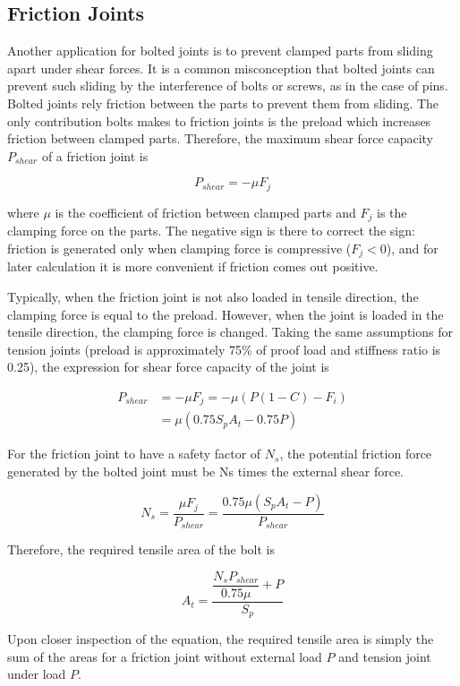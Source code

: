 \documentclass[a4paper,openany,12pt]{book}
\begin{document}
{{\subsection{Friction Joints}
\label{sec:orgb0b0839}
Another application for bolted joints is to prevent clamped parts from
sliding apart under shear forces. It is a common misconception that
bolted joints can prevent such sliding by the interference of bolts or
screws, as in the case of pins. Bolted joints rely friction between the
parts to prevent them from sliding. The only contribution bolts makes to
friction joints is the preload which increases friction between clamped
parts. Therefore, the maximum shear force capacity \(P_{shear}\) of a
friction joint is


$$P_{shear} = -\mu F_j$$

where \(\mu\) is the coefficient of friction between clamped parts and
\(F_j\) is the clamping force on the parts. The negative sign is there to
correct the sign: friction is generated only when clamping force is
compressive (\(F_j < 0\)), and for later calculation it is more convenient
if friction comes out positive.

Typically, when the friction joint is not also loaded in tensile
direction, the clamping force is equal to the preload. However, when the
joint is loaded in the tensile direction, the clamping force is changed.
Taking the same assumptions for tension joints (preload is approximately
75\% of proof load and stiffness ratio is 0.25), the expression for shear
force capacity of the joint is

$$\begin{aligned}
  P_{shear} &= -\mu F_j = -\mu \left( P(1 - C) - F_i \right) \\
            &= \mu (0.75S_pA_t - 0.75P)\end{aligned}$$

For the friction joint to have a safety factor of \(N_s\), the potential
friction force generated by the bolted joint must be Ns times the
external shear force.

$$N_s = \frac{\mu F_j}{P_{shear}} = \frac{0.75\mu (S_pA_t - P)}{P_{shear}}$$

Therefore, the required tensile area of the bolt is

$$A_t = \frac{\dfrac{N_s P_{shear}}{0.75\mu } + P}{S_p}$$

Upon closer inspection of the equation, the required tensile area is
simply the sum of the areas for a friction joint without external load
\(P\) and tension joint under load \(P\).

}}
\end{document}
